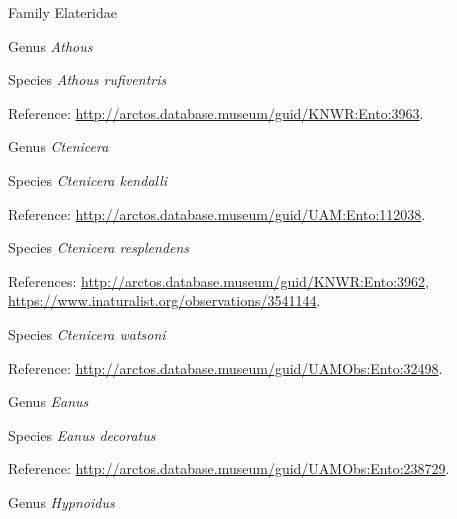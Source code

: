 \documentclass[9pt, article]{memoir}
\begin{document}
\begin{multicols}{2}
\vspace{6pt}\noindent\hspace{24pt}Family Elateridae


\vspace{6pt}\noindent\hspace{30pt}Genus \textit{Athous}


\vspace{6pt}\noindent\hspace{36pt}Species \textit{Athous rufiventris}


\vspace{6pt}Reference: 
\url{http://arctos.database.museum/guid/KNWR:Ento:3963}.

\vspace{6pt}\noindent\hspace{30pt}Genus \textit{Ctenicera}


\vspace{6pt}\noindent\hspace{36pt}Species \textit{Ctenicera kendalli}


\vspace{6pt}Reference: 
\url{http://arctos.database.museum/guid/UAM:Ento:112038}.

\vspace{6pt}\noindent\hspace{36pt}Species \textit{Ctenicera resplendens}


\vspace{6pt}References: 
\url{http://arctos.database.museum/guid/KNWR:Ento:3962}, 
\url{https://www.inaturalist.org/observations/3541144}.

\vspace{6pt}\noindent\hspace{36pt}Species \textit{Ctenicera watsoni}


\vspace{6pt}Reference: 
\url{http://arctos.database.museum/guid/UAMObs:Ento:32498}.

\vspace{6pt}\noindent\hspace{30pt}Genus \textit{Eanus}


\vspace{6pt}\noindent\hspace{36pt}Species \textit{Eanus decoratus}


\vspace{6pt}Reference: 
\url{http://arctos.database.museum/guid/UAMObs:Ento:238729}.

\vspace{6pt}\noindent\hspace{30pt}Genus \textit{Hypnoidus}



\end{multicols}
\end{document}
